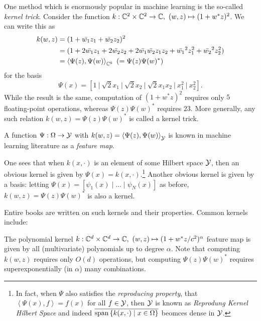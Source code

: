 One method which is enormously popular in machine learning 
\cite{kernel_OG,campbell2001,hofmann2008,muller2018}
is the so-called \emph{kernel trick}. Consider the function 
$k : \mathbb{C}^2 \times \mathbb{C}^2 \to \mathbb{C},\ (w,z) \mapsto (1 + w^* z)^2$. We can write this as 
\begin{equation}
    \begin{split}
        k(w, z) &= (1 + \bar{w_1} z_1 + \bar{w_2} z_2)^2 \\
        &= (1 + 2 \bar{w_1} z_1 + 2 \bar{w_2} z_2 + 2 \bar{w_1} \bar{w_2} z_1 z_2 + \bar{w_1}^2 z_1^2 + \bar{w_2}^2 z_2^2) \\
        &= \left\langle \Psi (z), \Psi (w) \right\rangle_{\bbC^6}\ (= \Psi (z) \Psi (w)^*)
    \end{split}
\end{equation}
for the basis 
\begin{equation}
    \Psi (x) = \left[ 
        1 \ \big|\ 
        \sqrt{2} x_1 \ \big|\ 
        \sqrt{2} x_2 \ \big|\ 
        \sqrt{2} x_1 x_2 \ \big|\ 
        x_1^2 \ \big|\ x_2^2 
    \right] . 
\end{equation}
While the result is the same, computation of $(1 + w^* z)^2$ requires only $5$ 
floating-point operations, whereas $\Psi (z) \Psi (w)^*$ requires $23$. More generally, 
any such relation $k(w, z) = \Psi (z) \Psi (w)^*$ is called a kernel trick. 
\begin{definition}
    A function $\Psi : \Omega \to \mathcal{Y}$ with 
    $k(w, z) = \left\langle \Psi (z), \Psi (w) \right\rangle_{\mathcal{Y}}$ is known in machine 
    learning literature as a \emph{feature map}. 
\end{definition}
One sees that when $k(x, \cdot)$ is an element of some Hilbert space $\mathcal{Y}$, then an 
obvious kernel is given by $\Psi (x) = k(x, \cdot)$.\footnote{
    In fact, when $\Psi$ also satisfies the \emph{reproducing property}, that 
    $\left\langle \Psi (x), f \right\rangle = f (x)$ for all $f \in \mathcal{Y}$, then $\mathcal{Y}$ 
    is known as \emph{Reprodung Kernel Hilbert Space} and indeed 
    $\overline{\text{span} \left\{ k(x, \cdot) \mid x \in \Omega \right\}}$ beomces dense in $\mathcal{Y}$. 
} Another obvious kernel is given by a basis: letting 
$\Psi (x) = \left[ \psi_1 (x) \mid \ldots \mid \psi_N (x) \right]$ as before, 
$k(w, z) = \Psi (z) \Psi (w)^*$ is also a kernel. 

Entire books are written on such kernels \cite{RKHS} and their properties. Common 
kernels include:

\begin{example}
    The polynomial kernel 
    $k : \mathbb{C}^d \times \mathbb{C}^d \to \mathbb{C},\ (w, z) \mapsto (1 + w^* z / c^2)^\alpha$ 
    feature map is given by all (multivariate) polynomials up to degree $\alpha$. Note 
    that computing $k(w, z)$ requires only $O(d)$ operations, but computing 
    $\Psi (z) \Psi (w)^*$ requires superexponentially (in $\alpha$) many combinations. 
\end{example}

